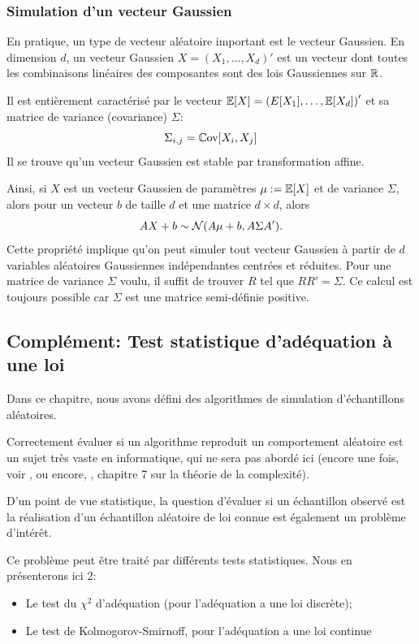 \subsubsection{Simulation d'un vecteur Gaussien}
En pratique, un type de vecteur aléatoire important est le vecteur Gaussien.
En dimension $d$, un vecteur Gaussien $X = \left(X_1,\dots,X_d\right)'$ est un vecteur dont toutes les combinaisons linéaires des composantes sont des lois Gaussiennes sur $\mathbb{R}$.

Il est entièrement caractérisé par le vecteur $\mathbb{E}[X] = \left(E[X_1], \dots, \mathbb{E}[X_d]\right)'$ et sa matrice de variance (covariance) $\Sigma$:
$$\Sigma_{i,j} = \mathbb{C}\text{ov}[X_i, X_j]$$
Il se trouve qu'un vecteur Gaussien est stable par transformation affine.

Ainsi, si $X$ est un vecteur Gaussien de paramètres $\mu := \mathbb{E}[X]$ et de variance $\Sigma$, alors pour un vecteur $b$ de taille $d$ et une matrice $d \times d$, alors $$AX + b \sim \mathcal{N}(A\mu + b, A\Sigma A').$$
Cette propriété implique qu'on peut simuler tout vecteur Gaussien à partir de $d$ variables aléatoires Gaussiennes indépendantes centrées et réduites. 
Pour une matrice de variance $\Sigma$ voulu, il suffit de trouver $R$ tel que $RR' = \Sigma$. Ce calcul est toujours possible car $\Sigma$ est une matrice semi-définie positive. 

\subsection{Complément: Test statistique d'adéquation à une loi}
\label{sec:test:adequation}

Dans ce chapitre, nous avons défini des algorithmes de simulation  d'échantillons aléatoires. 

Correctement évaluer si un algorithme reproduit un comportement aléatoire est un sujet très vaste en informatique, qui ne sera pas abordé ici (encore une fois, voir \cite{knuth1997art}, ou encore, \citep{cover2006elements}, chapitre 7 sur la théorie de la complexité).

D'un point de vue statistique, la question d'évaluer si un échantillon observé est la réalisation d'un échantillon aléatoire de loi connue est également un problème d'intérêt.

Ce problème peut être traité par différents tests statistiques.
Nous en présenterons ici 2: 
\begin{itemize}
\item Le test du $\chi^2$ d'adéquation (pour l'adéquation a une loi discrète); 
\item Le test de Kolmogorov-Smirnoff, pour l'adéquation a une loi continue
\end{itemize}

